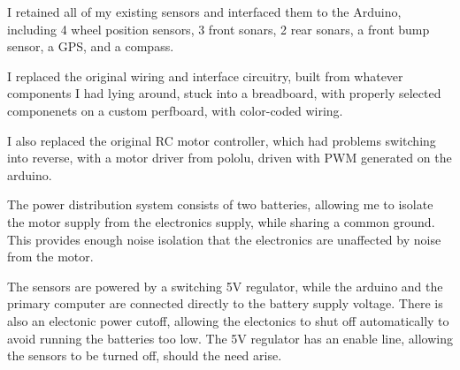 I retained all of my existing sensors and interfaced them to the Arduino, including 4 wheel position sensors, 3 front sonars, 2 rear sonars, a front bump sensor, a GPS, and a compass.

I replaced the original wiring and interface circuitry, built from whatever components I had lying around, stuck into a breadboard, with properly selected componenets on a custom perfboard, with color-coded wiring.

I also replaced the original RC motor controller, which had problems switching into reverse, with a motor driver from pololu, driven with PWM generated on the arduino.

The power distribution system consists of two batteries, allowing me to isolate the motor supply from the electronics supply, while sharing a common ground. This provides enough noise isolation that the electronics are unaffected by noise from the motor.

The sensors are powered by a switching 5V regulator, while the arduino and the primary computer are connected directly to the battery supply voltage. There is also an electonic power cutoff, allowing the electonics to shut off automatically to avoid running the batteries too low. The 5V regulator has an enable line, allowing the sensors to be turned off, should the need arise.
